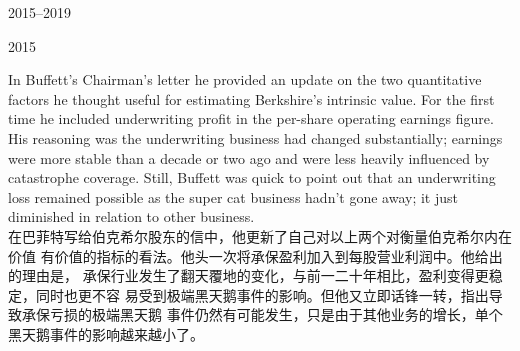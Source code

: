 \begin{chapter}{2015--2019}
\begin{section}{2015}
\begin{verseparallel}
  {
    In Buffett's Chairman's letter he provided an update on the two quantitative
    factors he thought useful for estimating Berkshire's intrinsic value. For
    the first time he included underwriting profit in the per-share operating
    earnings figure.  His
    reasoning was the underwriting business had changed substantially; earnings
    were more stable than a decade or two ago and were less heavily influenced
    by catastrophe coverage. Still, Buffett was quick to point out that an
    underwriting loss remained possible as the super cat
    business hadn't gone away; it just diminished in relation to other business. \\
  }
  {
    在巴菲特写给伯克希尔股东的信中，他更新了自己对以上两个对衡量伯克希尔内在价值
    有价值的指标的看法。他头一次将承保盈利加入到每股营业利润中。他给出的理由是，
    承保行业发生了翻天覆地的变化，与前一二十年相比，盈利变得更稳定，同时也更不容
    易受到极端黑天鹅事件的影响。但他又立即话锋一转，指出导致承保亏损的极端黑天鹅
    事件仍然有可能发生，只是由于其他业务的增长，单个黑天鹅事件的影响越来越小了。
  }
\end{verseparallel}


\end{section}
\end{chapter}
